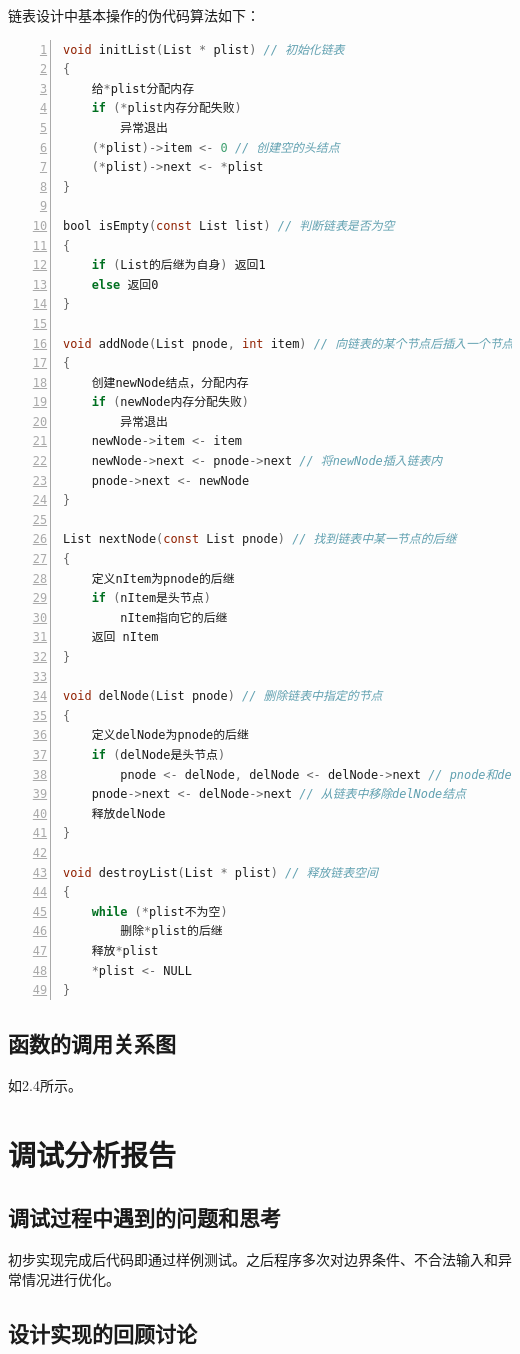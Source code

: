\documentclass{article}
\begin{document}
链表设计中基本操作的伪代码算法如下：
\begin{lstlisting}[language={C},
    numbers=left,
    numberstyle=\tiny\menlo,
    basicstyle=\small\menlo]
void initList(List * plist) // 初始化链表
{    
    给*plist分配内存
    if (*plist内存分配失败)
        异常退出
    (*plist)->item <- 0 // 创建空的头结点
    (*plist)->next <- *plist
}

bool isEmpty(const List list) // 判断链表是否为空
{    
    if (List的后继为自身) 返回1
    else 返回0
}

void addNode(List pnode, int item) // 向链表的某个节点后插入一个节点
{    
    创建newNode结点，分配内存
    if (newNode内存分配失败)
        异常退出
    newNode->item <- item
    newNode->next <- pnode->next // 将newNode插入链表内
    pnode->next <- newNode
}

List nextNode(const List pnode) // 找到链表中某一节点的后继
{
    定义nItem为pnode的后继
    if (nItem是头节点) 
        nItem指向它的后继
    返回 nItem
}

void delNode(List pnode) // 删除链表中指定的节点
{
    定义delNode为pnode的后继
    if (delNode是头节点)
        pnode <- delNode, delNode <- delNode->next // pnode和delNode都指向他们的后继
    pnode->next <- delNode->next // 从链表中移除delNode结点
    释放delNode
}

void destroyList(List * plist) // 释放链表空间
{
    while (*plist不为空)
        删除*plist的后继
    释放*plist
    *plist <- NULL
}    
\end{lstlisting}

\subsection{函数的调用关系图}

如2.4所示。

\section{调试分析报告}

\subsection{调试过程中遇到的问题和思考}

初步实现完成后代码即通过样例测试。之后程序多次对边界条件、不合法输入和异常情况进行优化。

\subsection{设计实现的回顾讨论}
\end{document}
